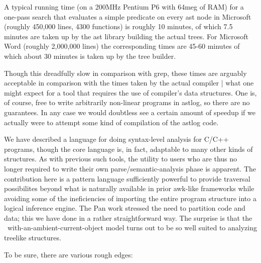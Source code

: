A typical running time (on a 200MHz Pentium P6 with
64meg of RAM) for a one-pass search that evaluates
a simple predicate on every ast node in Microsoft
 (roughly 450,000 lines, 4300 functions) is
roughly 10 minutes, of which 7.5 minutes are taken up
by the ast library building the actual trees. For Microsoft
Word (roughly 2,000,000 lines) the corresponding
times are 45-60 minutes of which about 30 minutes
is taken up by the tree builder.

Though this dreadfully slow in comparison with
grep, these times are arguably acceptable in comparison
with the times taken by the actual compiler |
what one might expect for a tool that requires the use
of compiler's data structures. One is, of course, free
to write arbitrarily non-linear programs in astlog, so
there are no guarantees. In any case we would doubtless
see a certain amount of speedup if we actually were
to attempt some kind of compilation of the astlog
code.


We have described a language for doing syntax-level
analysis for C/C++ programs, though the core language
is, in fact, adaptable to many other kinds of
structures. As with previous such tools, the utility
to users who are thus no longer required to write
their own parse/semantic-analysis phase is apparent.
The contribution here is a pattern language sufficiently
powerful to provide traversal possibilites beyond what
is naturally available in prior awk-like frameworks
while avoiding some of the ineficiencies of importing
the entire program structure into a logical inference
engine. The Pan work \cite{BGV90} stressed the need to
partition code and data; this we have done in a rather
straightforward way. The surprise is that the \prolog\
with-an-ambient-current-object model turns out to be
so well suited to analyzing treelike structures.

To be sure, there are various rough edges:

